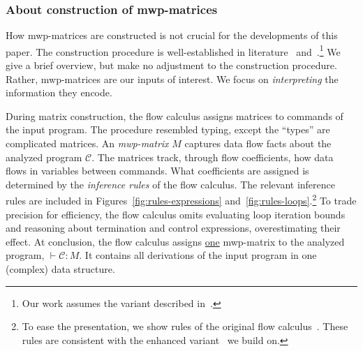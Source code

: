\subsubsection{About construction of mwp-matrices}
\label{subsec:matrices}

How mwp-matrices are constructed is not crucial for the developments of this paper.
The construction procedure is well-established in literature~\cite[Sect. 5--6]{jones2009} and~\cite[Sect. 2--3]{aubert20222}.\footnote{Our work assumes the variant described in~\cite{aubert20222}.}
We give a brief overview, but make no adjustment to the construction procedure.
Rather, mwp-matrices are our inputs of interest.
We focus on \emph{interpreting} the information they encode.

During matrix construction, the flow calculus assigns matrices to commands of the input program.
The procedure resembled typing, except the \enquote{types} are complicated matrices.
An \emph{mwp-matrix} \(M\) captures data flow facts about the analyzed program \(\mathcal{C}\).
The matrices track, through flow coefficients, how data flows in variables between commands.
What coefficients are assigned is determined by the \emph{inference rules} of the flow calculus.
The relevant inference rules are included in Figures~\ref{fig:rules-expressions} and~\ref{fig:rules-loops}.\footnote{
    To ease the presentation, we show rules of the original flow calculus~\cite{jones2009}. These rules are consistent with the enhanced variant~\cite{aubert20222} we build on.}
To trade precision for efficiency, the flow calculus omits evaluating loop iteration bounds and reasoning about termination and control expressions, overestimating their effect.
At conclusion, the flow calculus assigns \underline{one} mwp-matrix to the analyzed program, \(\vdash\mathcal{C} : M\).
It contains all derivations of the input program in one (complex) data structure.


